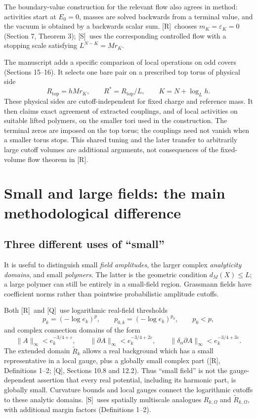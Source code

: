 \documentclass[11pt]{article}
\numberwithin{equation}{section}
\newcommand{\Q}{\textup{[Q]}}
\newcommand{\UR}{\textup{[R]}}
\newcommand{\US}{\textup{[S]}}
\begin{document}
The boundary-value construction for the relevant flow also agrees
in method: activities start at $E_0=0$, masses are solved backwards
from a terminal value, and the vacuum is obtained by a backwards
scalar sum. \UR\ chooses $m_K=\varepsilon_K=0$
(Section 7, Theorem 3); \US\ uses the corresponding controlled flow
with a stopping scale satisfying $L^{N-K}=Mr_K$.

The manuscript adds a specific comparison of local operations on
odd covers (Sections 15--16). It selects one bare pair on a prescribed
top torus of physical side
\begin{equation}
 R_{\mathrm{top}}=hMr_K,\qquad
 R^*=R_{\mathrm{top}}/L,\qquad K=N+\log_Lh.
\end{equation}
These physical sides are cutoff-independent for fixed charge and
reference mass. It then claims exact agreement of extracted
couplings, and of local activities on suitable lifted polymers,
on the smaller tori used in the construction. The terminal zeros are
imposed on the top torus; the couplings need not vanish when a smaller
torus stops. This shared tuning and the later transfer to arbitrarily
large cutoff volumes are additional arguments, not consequences of
the fixed-volume flow theorem in \UR.

\section{Small and large fields: the main methodological difference}

\subsection{Three different uses of ``small''}

It is useful to distinguish small \emph{field amplitudes}, the larger
complex \emph{analyticity domains}, and small \emph{polymers}.
The latter is the geometric condition $d_M(X)\le L$; a large polymer
can still be entirely in a small-field region.
Grassmann fields have coefficient norms rather than pointwise
probabilistic amplitude cutoffs.

Both \UR\ and \Q\ use logarithmic real-field thresholds
\begin{equation}
 p_k=(-\log e_k)^p,\qquad p_{0,k}=(-\log e_k)^{p_0},
 \qquad p_0<p,
\end{equation}
and complex connection domains of the form
\begin{equation}
 \|A\|_\infty<e_k^{-3/4+\varepsilon},\qquad
 \|\partial A\|_\infty<e_k^{-3/4+2\varepsilon},\qquad
 \|\delta_\alpha\partial A\|_\infty<e_k^{-3/4+3\varepsilon}.
 \label{eq:digest-domain}
\end{equation}
The extended domain $\widetilde R_k$ allows a real background which
has a small representative in a local gauge, plus a globally small
complex part (\UR, Definitions 1--2; \Q, Sections 10.8 and 12.2).
Thus ``small field'' is not the gauge-dependent assertion that every
real potential, including its harmonic part, is globally small.
Curvature bounds and local gauges connect the logarithmic cutoffs to
these analytic domains. \US\ uses spatially multiscale analogues
$R_{k,\Omega}$ and $\widetilde R_{k,\Omega}$, with additional margin
factors (Definitions 1--2).
\end{document}
